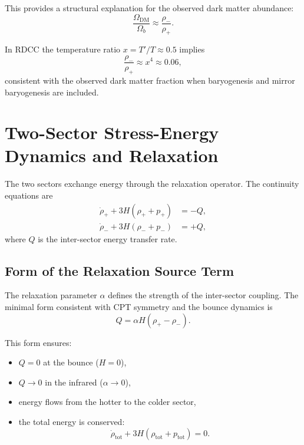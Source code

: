 \documentclass[11pt,a4paper]{article}
\begin{document}
This provides a structural explanation for the observed dark matter abundance:
\begin{equation}
\frac{\Omega_{\mathrm{DM}}}{\Omega_b} \approx \frac{\rho_-}{\rho_+}.
\end{equation}

In RDCC the temperature ratio $x = T'/T \approx 0.5$ implies
\begin{equation}
\frac{\rho_-}{\rho_+} \approx x^4 \approx 0.06,
\end{equation}
consistent with the observed dark matter fraction when baryogenesis and mirror baryogenesis are included.

\section{Two-Sector Stress-Energy Dynamics and Relaxation}

The two sectors exchange energy through the relaxation operator. The continuity equations are
\begin{align}
\dot{\rho}_+ + 3H(\rho_+ + p_+) &= -Q, \\
\dot{\rho}_- + 3H(\rho_- + p_-) &= +Q,
\end{align}
where $Q$ is the inter-sector energy transfer rate.

\subsection{Form of the Relaxation Source Term}

The relaxation parameter $\alpha$ defines the strength of the inter-sector coupling. The minimal form consistent with CPT symmetry and the bounce dynamics is
\begin{equation}
Q = \alpha H (\rho_+ - \rho_-).
\label{eq:Q}
\end{equation}

This form ensures:

\begin{itemize}
\item $Q = 0$ at the bounce ($H = 0$),
\item $Q \to 0$ in the infrared ($\alpha \to 0$),
\item energy flows from the hotter to the colder sector,
\item the total energy is conserved:
\begin{equation}
\dot{\rho}_{\mathrm{tot}} + 3H(\rho_{\mathrm{tot}} + p_{\mathrm{tot}}) = 0.
\end{equation}
\end{itemize}
\end{document}
